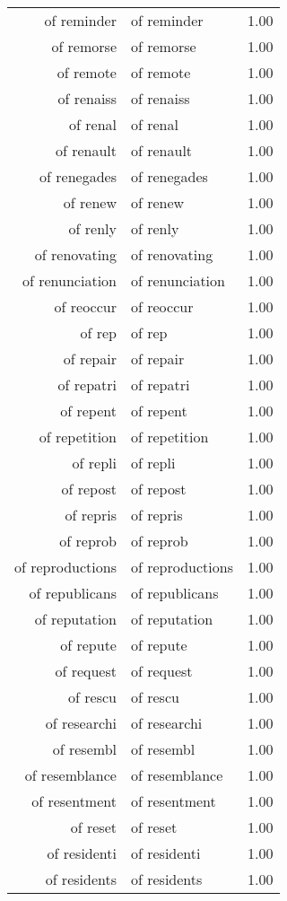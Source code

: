\begin{table}[ht]
\begin{tabular}{rlr}
  of reminder & of reminder & 1.00 \\ 
  of remorse & of remorse & 1.00 \\ 
  of remote & of remote & 1.00 \\ 
  of renaiss & of renaiss & 1.00 \\ 
  of renal & of renal & 1.00 \\ 
  of renault & of renault & 1.00 \\ 
  of renegades & of renegades & 1.00 \\ 
  of renew & of renew & 1.00 \\ 
  of renly & of renly & 1.00 \\ 
  of renovating & of renovating & 1.00 \\ 
  of renunciation & of renunciation & 1.00 \\ 
  of reoccur & of reoccur & 1.00 \\ 
  of rep & of rep & 1.00 \\ 
  of repair & of repair & 1.00 \\ 
  of repatri & of repatri & 1.00 \\ 
  of repent & of repent & 1.00 \\ 
  of repetition & of repetition & 1.00 \\ 
  of repli & of repli & 1.00 \\ 
  of repost & of repost & 1.00 \\ 
  of repris & of repris & 1.00 \\ 
  of reprob & of reprob & 1.00 \\ 
  of reproductions & of reproductions & 1.00 \\ 
  of republicans & of republicans & 1.00 \\ 
  of reputation & of reputation & 1.00 \\ 
  of repute & of repute & 1.00 \\ 
  of request & of request & 1.00 \\ 
  of rescu & of rescu & 1.00 \\ 
  of researchi & of researchi & 1.00 \\ 
  of resembl & of resembl & 1.00 \\ 
  of resemblance & of resemblance & 1.00 \\ 
  of resentment & of resentment & 1.00 \\ 
  of reset & of reset & 1.00 \\ 
  of residenti & of residenti & 1.00 \\ 
  of residents & of residents & 1.00 \\ 

\end{tabular}
\end{table}
